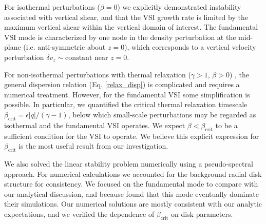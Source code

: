 For isothermal perturbations ($\beta=0$) we explicitly
demonstrated instability  associated with vertical shear, and that the 
VSI growth rate is limited by the maximum vertical shear within the 
vertical domain of interest. The fundamental VSI mode is characterized
by one node in the density perturbation at the mid-plane
(i.e. anti-symmetric about $z=0$), which corresponds to a vertical
velocity perturbation  $\delta v_z\sim\mathrm{constant}$ near
$z=0$. 


For non-isothermal  perturbations with thermal relaxation ($\gamma>1$,
$\beta>0$) , the general dispersion relation (Eq. \ref{relax_disp}) is
complicated and requires a numerical treatment. However, for the 
fundamental VSI some simplification is  possible. In particular, we
quantified the critical thermal relaxation timescale
$\beta_\mathrm{crit}=\epsilon|q|/(\gamma-1)$, below which small-scale
perturbations may be regarded as isothermal and the fundamental VSI
operates.  We expect $\beta<\beta_\mathrm{crit}$ to be a sufficient
condition for the VSI to operate. We believe this explicit expression for
$\beta_\mathrm{crit}$ is the most useful result from our
investigation.  

We also solved the linear stability problem numerically using a
pseudo-spectral approach. For numerical calculations we accounted for
the background radial disk structure for consistency. We focused
on the fundamental mode to compare with our analytical
discussion, and because \cite{nelson13} found that this mode 
eventually dominate their simulations. Our numerical solutions are
mostly consistent with our analytic expectations, and we verified the
dependence of $\beta_\mathrm{crit}$ on disk parameters. 


